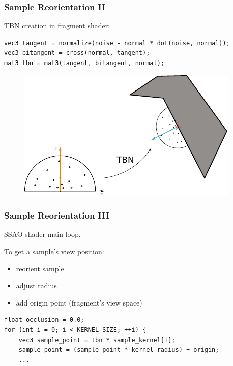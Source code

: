 \documentclass{beamer}
\begin{document}
\begin{frame}[fragile]
\frametitle{Sample Reorientation II}

TBN creation in fragment shader:
\begin{verbatim}
vec3 tangent = normalize(noise - normal * dot(noise, normal));
vec3 bitangent = cross(normal, tangent);
mat3 tbn = mat3(tangent, bitangent, normal);
\end{verbatim}

\begin{figure}
    \includegraphics[width=0.7\linewidth]{images/kernel_reorientation.pdf}
    \centering
\end{figure}

\end{frame}

\begin{frame}[fragile]
\frametitle{Sample Reorientation III}
SSAO shader main loop.

To get a sample's view position:
\begin{itemize}
    \item reorient sample
    \item adjust radius
    \item add origin point (fragment's view space)
\end{itemize}
\begin{verbatim}
float occlusion = 0.0;
for (int i = 0; i < KERNEL_SIZE; ++i) {
    vec3 sample_point = tbn * sample_kernel[i];
    sample_point = (sample_point * kernel_radius) + origin;
    ...
\end{verbatim}

\end{frame}
\end{document}
